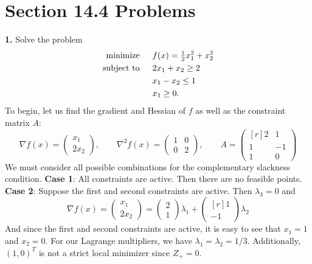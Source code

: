 \documentclass{article}
\begin{document}
\section*{Section 14.4 Problems}
\textbf{1.} Solve the problem 
\begin{align*}
    \text{minimize} \hspace{1.5em} &f(x) = \tfrac{1}{2}x_1^2 + x_2^2\\
    \text{subject to} \hspace{1.5em} &2x_1 + x_2 \geq 2\\
    &x_1 - x_2 \leq 1\\
    &x_1 \geq 0.
\end{align*}
To begin, let us find the gradient and Hessian of $f$ as well as the constraint matrix $A$:
\[\nabla f(x) = \begin{pmatrix}
    x_1\\
    2x_2
\end{pmatrix}, \hspace{2em}
\nabla^2f(x) = \begin{pmatrix}
    1 & 0\\
    0 & 2
\end{pmatrix}, \hspace{2em}
A = \begin{pmatrix*}[r]
    2 & 1\\
    1 & -1\\
    1 & 0
\end{pmatrix*}\]
We must consider all possible combinations for the complementary slackness condition. 
\newline
\textbf{Case 1}: All constraints are active. Then there are no feasible points.
\newline
\textbf{Case 2}: Suppose the first and second constraints are active. Then $\lambda_3 = 0$ and
\[\nabla f(x) = \begin{pmatrix}
    x_1\\
    2x_2
\end{pmatrix} = \begin{pmatrix}
    2\\
    1
\end{pmatrix}\lambda_1 + \begin{pmatrix*}[r]
    1\\
    -1
\end{pmatrix*}\lambda_2\]
And since the first and second constraints are active, it is easy to see that $x_1 = 1$ and $x_2 = 0$. For our Lagrange multipliers, we have $\lambda_1 = \lambda_2 = 1/3$. Additionally, $(1,0)^T$ is not a strict local minimizer since $Z_+ = 0$. 
\end{document}
